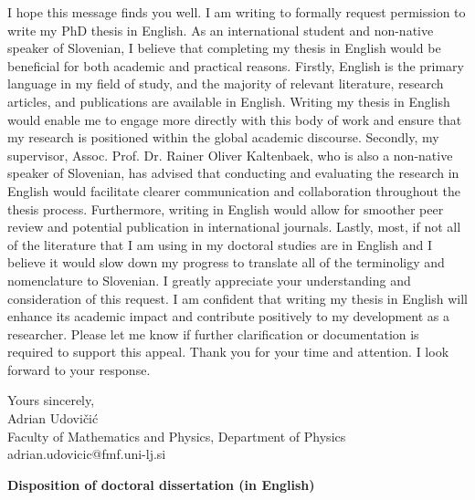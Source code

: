 \documentclass{article}
\begin{document}
I hope this message finds you well. I am writing to formally request permission to write my PhD thesis in English.
As an international student and non-native speaker of Slovenian, I believe that completing my thesis in English would be beneficial for both academic and practical reasons.
Firstly, English is the primary language in my field of study, and the majority of relevant literature, research articles, and publications are available in English.
Writing my thesis in English would enable me to engage more directly with this body of work and ensure that my research is positioned within the global academic discourse.
Secondly, my supervisor, Assoc. Prof. Dr. Rainer Oliver Kaltenbaek, who is also a non-native speaker of Slovenian, has advised that conducting and evaluating the research in
English would facilitate clearer communication and collaboration throughout the thesis process. Furthermore, writing in English would allow for smoother peer review
and potential publication in international journals.
Lastly, most, if not all of the literature that I am using in my doctoral studies are in English and I believe it would slow down my progress to translate
all of the terminoligy and nomenclature to Slovenian.
I greatly appreciate your understanding and consideration of this request. I am confident that writing my thesis in English will enhance its academic
impact and contribute positively to my development as a researcher. Please let me know if further clarification or documentation is required to support this appeal.
Thank you for your time and attention. I look forward to your response.

\vspace{1cm}
Yours sincerely,\\
Adrian Udovičić\\
Faculty of Mathematics and Physics, Department of Physics\\
adrian.udovicic@fmf.uni-lj.si


\clearpage
\pagestyle{plain}

\begin{center}
	\textbf{\Large Disposition of doctoral dissertation (in English)}
\end{center}

\end{document}
